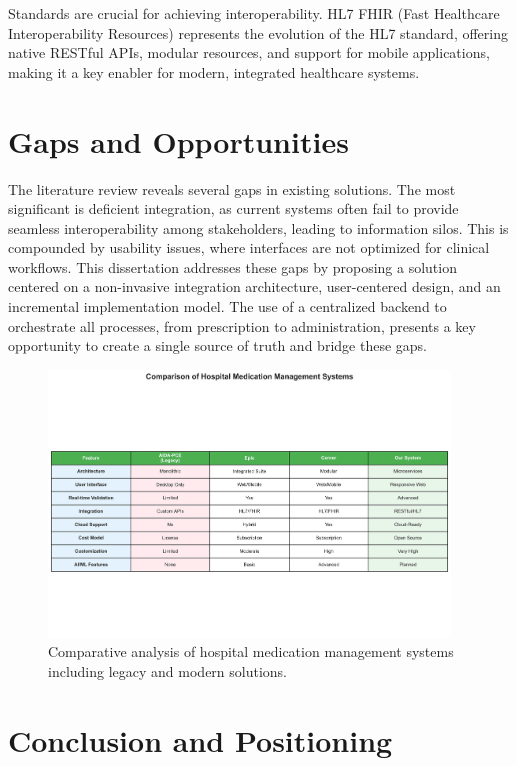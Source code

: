 Standards are crucial for achieving interoperability. HL7 FHIR (Fast Healthcare Interoperability Resources) represents the evolution of the HL7 standard, offering native RESTful APIs, modular resources, and support for mobile applications, making it a key enabler for modern, integrated healthcare systems.

\section{Gaps and Opportunities}

The literature review reveals several gaps in existing solutions. The most significant is deficient integration, as current systems often fail to provide seamless interoperability among stakeholders, leading to information silos. This is compounded by usability issues, where interfaces are not optimized for clinical workflows. This dissertation addresses these gaps by proposing a solution centered on a non-invasive integration architecture, user-centered design, and an incremental implementation model. The use of a centralized backend to orchestrate all processes, from prescription to administration, presents a key opportunity to create a single source of truth and bridge these gaps.

\begin{figure}[htbp]
    \centering
    \includegraphics[width=0.95\textwidth]{images/generated/system_comparison_table.png}
    \caption{Comparative analysis of hospital medication management systems including legacy and modern solutions.}
    \label{tab:comparison}
\end{figure}

\section{Conclusion and Positioning}

